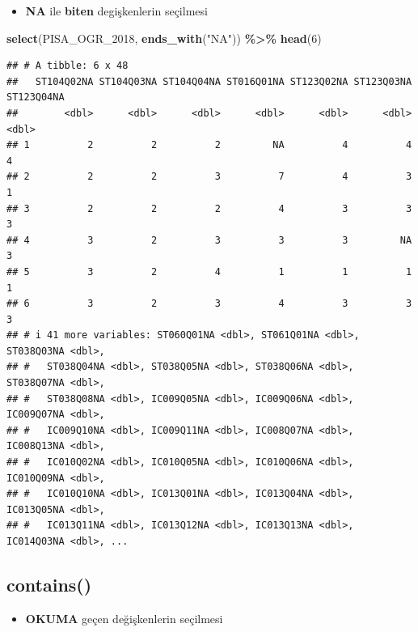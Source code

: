 \documentclass[
  oneside]{book}
\newenvironment{Shaded}{\begin{snugshade}}{\end{snugshade}}
\newcommand{\DecValTok}[1]{\textcolor[rgb]{0.00,0.00,0.81}{#1}}
\newcommand{\FunctionTok}[1]{\textcolor[rgb]{0.13,0.29,0.53}{\textbf{#1}}}
\newcommand{\NormalTok}[1]{#1}
\newcommand{\SpecialCharTok}[1]{\textcolor[rgb]{0.81,0.36,0.00}{\textbf{#1}}}
\newcommand{\StringTok}[1]{\textcolor[rgb]{0.31,0.60,0.02}{#1}}
\providecommand{\tightlist}{%
  \setlength{\itemsep}{0pt}\setlength{\parskip}{0pt}}
\begin{document}
\begin{itemize}
\tightlist
\item
  \textbf{NA} ile \textbf{biten} degişkenlerin seçilmesi
\end{itemize}

\begin{Shaded}
\begin{Highlighting}[]
\FunctionTok{select}\NormalTok{(PISA\_OGR\_2018, }\FunctionTok{ends\_with}\NormalTok{(}\StringTok{"NA"}\NormalTok{)) }\SpecialCharTok{\%\textgreater{}\%} \FunctionTok{head}\NormalTok{(}\DecValTok{6}\NormalTok{)}
\end{Highlighting}
\end{Shaded}

\begin{verbatim}
## # A tibble: 6 x 48
##   ST104Q02NA ST104Q03NA ST104Q04NA ST016Q01NA ST123Q02NA ST123Q03NA ST123Q04NA
##        <dbl>      <dbl>      <dbl>      <dbl>      <dbl>      <dbl>      <dbl>
## 1          2          2          2         NA          4          4          4
## 2          2          2          3          7          4          3          1
## 3          2          2          2          4          3          3          3
## 4          3          2          3          3          3         NA          3
## 5          3          2          4          1          1          1          1
## 6          3          2          3          4          3          3          3
## # i 41 more variables: ST060Q01NA <dbl>, ST061Q01NA <dbl>, ST038Q03NA <dbl>,
## #   ST038Q04NA <dbl>, ST038Q05NA <dbl>, ST038Q06NA <dbl>, ST038Q07NA <dbl>,
## #   ST038Q08NA <dbl>, IC009Q05NA <dbl>, IC009Q06NA <dbl>, IC009Q07NA <dbl>,
## #   IC009Q10NA <dbl>, IC009Q11NA <dbl>, IC008Q07NA <dbl>, IC008Q13NA <dbl>,
## #   IC010Q02NA <dbl>, IC010Q05NA <dbl>, IC010Q06NA <dbl>, IC010Q09NA <dbl>,
## #   IC010Q10NA <dbl>, IC013Q01NA <dbl>, IC013Q04NA <dbl>, IC013Q05NA <dbl>,
## #   IC013Q11NA <dbl>, IC013Q12NA <dbl>, IC013Q13NA <dbl>, IC014Q03NA <dbl>, ...
\end{verbatim}

\hypertarget{contains}{%
\subsection{\texorpdfstring{\textbf{contains()}}{contains()}}\label{contains}}

\begin{itemize}
\tightlist
\item
  \textbf{OKUMA} geçen değişkenlerin seçilmesi
\end{itemize}
\end{document}
